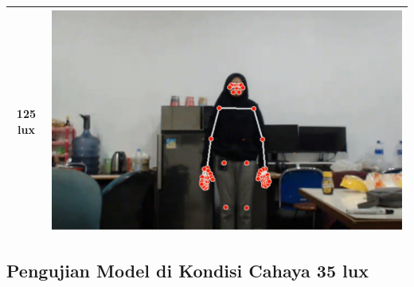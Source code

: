 \begin{longtable}{|c|c|}
  \hline
  125 lux            & \includegraphics[scale=0.3]{gambar/bab4-terang.png}                 \\
  \hline
\end{longtable}

\newpage
\subsection{Pengujian Model di Kondisi Cahaya 35 lux}
\label{sec:analisiscahaya1}

